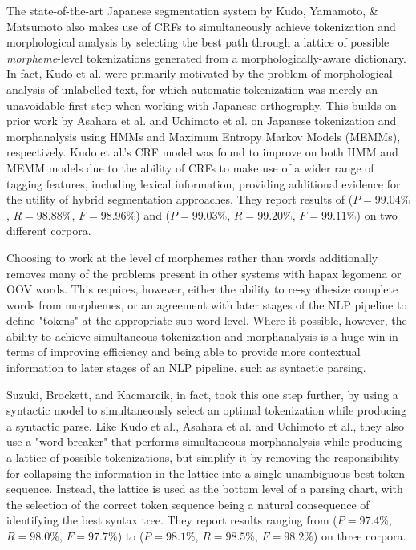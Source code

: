 The state-of-the-art Japanese segmentation system by Kudo, Yamamoto, \& Matsumoto\cite{kudo04} also makes use of CRFs to simultaneously achieve tokenization and morphological analysis by selecting the best path through a lattice of possible \textit{morpheme}-level tokenizations generated from a morphologically-aware dictionary. In fact, Kudo et al. were primarily motivated by the problem of morphological analysis of unlabelled text, for which automatic tokenization was merely an unavoidable first step when working with Japanese orthography. This builds on prior work by Asahara et al.\cite{asahara00} and Uchimoto et al.\cite{uchimoto01} on Japanese tokenization and morphanalysis using HMMs and Maximum Entropy Markov Models (MEMMs), respectively. Kudo et al.'s CRF model was found to improve on both HMM and MEMM models due to the ability of CRFs to make use of a wider range of tagging features, including lexical information, providing additional evidence for the utility of hybrid segmentation approaches. They report results of ($P = 99.04\%$, $R = 98.88\%$, $F = 98.96\%$) and ($P = 99.03\%$, $R = 99.20\%$, $F = 99.11\%$) on two different corpora.

Choosing to work at the level of morphemes rather than words additionally removes many of the problems present in other systems with hapax legomena or OOV words. This requires, however, either the ability to re-synthesize complete words from morphemes, or an agreement with later stages of the NLP pipeline to define "tokens" at the appropriate sub-word level. Where it possible, however, the ability to achieve simultaneous tokenization and morphanalysis is a huge win in terms of improving efficiency and being able to provide more contextual information to later stages of an NLP pipeline, such as syntactic parsing.

Suzuki, Brockett, and Kacmarcik\cite{suzuki00}, in fact, took this one step further, by using a syntactic model to simultaneously select an optimal tokenization while producing a syntactic parse. Like Kudo et al.\cite{kudo04}, Asahara et al.\cite{asahara00} and Uchimoto et al.\cite{uchimoto01}, they also use a "word breaker" that performs simultaneous morphanalysis while producing a lattice of possible tokenizations, but simplify it by removing the responsibility for collapsing the information in the lattice into a single unambiguous best token sequence. Instead, the lattice is used as the bottom level of a parsing chart, with the selection of the correct token sequence being a natural consequence of identifying the best syntax tree. They report results ranging from ($P = 97.4\%$, $R = 98.0\%$, $F = 97.7\%$) to ($P = 98.1\%$, $R = 98.5\%$, $F = 98.2\%$) on three corpora.


